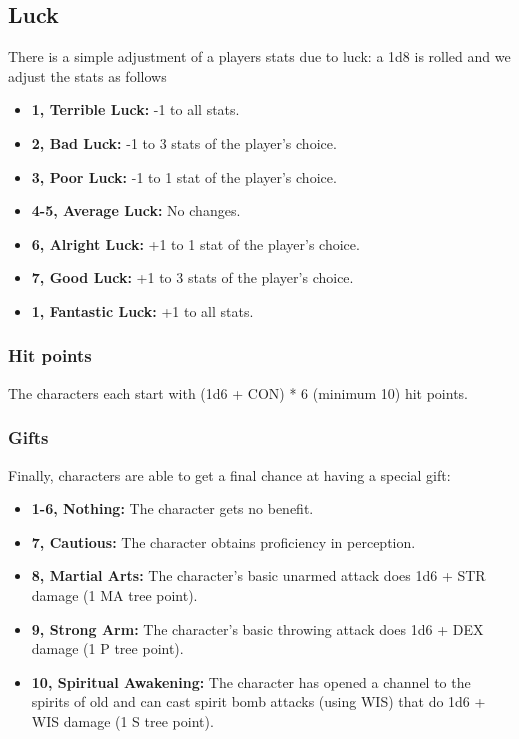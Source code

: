 \documentclass[letterpaper,12pt]{article}
\begin{document}
\subsection{Luck}

There is a simple adjustment of a players stats due to luck: a 1d8 is rolled and we adjust the stats as follows

\begin{itemize}
\item \textbf{1, Terrible Luck:} -1 to all stats.
\item \textbf{2, Bad Luck:} -1 to 3 stats of the player's choice.
\item \textbf{3, Poor Luck:} -1 to 1 stat of the player's choice.
\item \textbf{4-5, Average Luck:} No changes.
\item \textbf{6, Alright Luck:} +1 to 1 stat of the player's choice.
\item \textbf{7, Good Luck:} +1 to 3 stats of the player's choice.
\item \textbf{1, Fantastic Luck:} +1 to all stats.
\end{itemize}

\subsubsection{Hit points}

The characters each start with (1d6 + CON) * 6 (minimum 10) hit points.

\subsubsection{Gifts}

Finally, characters are able to get a final chance at having a special gift:

\begin{itemize}
\item \textbf{1-6, Nothing:} The character gets no benefit.
\item \textbf{7, Cautious:} The character obtains proficiency in perception.
\item \textbf{8, Martial Arts:} The character's basic unarmed attack does 1d6 + STR damage (1 MA tree point). 
\item \textbf{9, Strong Arm:} The character's basic throwing attack does 1d6 + DEX damage (1 P tree point).
\item \textbf{10, Spiritual Awakening:} The character has opened a channel to the spirits of old and can cast spirit bomb attacks (using WIS) that do 1d6 + WIS damage (1 S tree point).
\end{itemize}
\end{document}
